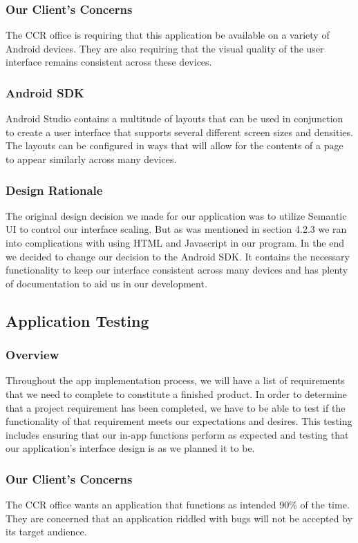 \documentclass[draftclsnofoot, onecolumn, 10pt, compsoc]{IEEEtran}
\begin{document}
			\subsubsection{Our Client's Concerns}
				The CCR office is requiring that this application be available on a variety of Android devices. They are also requiring that the visual quality of the user interface remains consistent across these devices.
			\subsubsection{Android SDK}
				Android Studio contains a multitude of layouts that can be used in conjunction to create a user interface that supports several different screen sizes and densities. The layouts can be configured in ways that will allow for the contents of a page to appear similarly across many devices.

			\subsubsection{Design Rationale}
				The original design decision we made for our application was to utilize Semantic UI to control our interface scaling. But as was mentioned in section 4.2.3 we ran into complications with using HTML and Javascript in our program. In the end we decided to change our decision to the Android SDK. It contains the necessary functionality to keep our interface consistent across many devices and has plenty of documentation to aid us in our development.

		\subsection{Application Testing}
			\subsubsection{Overview}
				Throughout the app implementation process, we will have a list of requirements that we need to complete to constitute a finished product. In order to determine that a project requirement has been completed, we have to be able to test if the functionality of that requirement meets our expectations and desires. This testing includes ensuring that our in-app functions perform as expected and testing that our application's interface design is as we planned it to be.
			\subsubsection{Our Client's Concerns}
				The CCR office wants an application that functions as intended 90\% of the time. They are concerned that an application riddled with bugs will not be accepted by its target audience.
\end{document}
